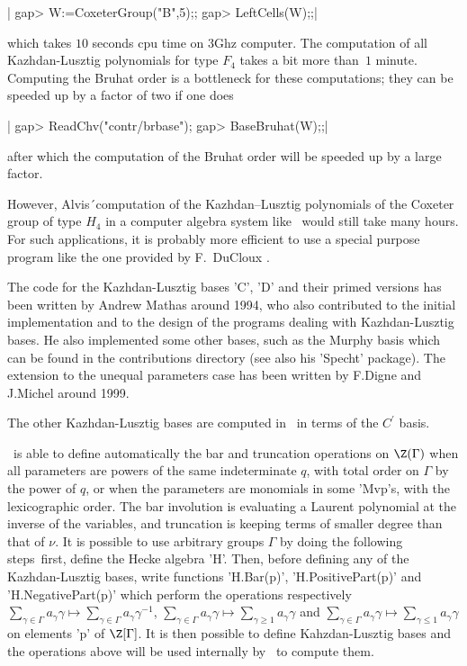|    gap> W:=CoxeterGroup("B",5);;
    gap> LeftCells(W);;|

which  takes $10$ seconds cpu time on 3Ghz computer. The computation of all
Kazhdan-Lusztig  polynomials  for  type  $F_4$  takes  a  bit more than~$1$
minute.  Computing the Bruhat order is a bottleneck for these computations;
they can be speeded up by a factor of two if one does\:

|    gap> ReadChv("contr/brbase");
    gap> BaseBruhat(W);;|

after  which the computation  of the Bruhat  order will be  speeded up by a
large factor.

However,  Alvis\'\ computation  of the  Kazhdan--Lusztig polynomials of the
Coxeter  group of type $H_4$ in a  computer algebra system like \GAP\ would
still take many hours. For such applications, it is probably more efficient
to  use a  special purpose  program like  the one  provided by  F.\ DuCloux
\cite{DuC91}.

The  code for the Kazhdan-Lusztig bases  'C', 'D' and their primed versions
has  been written by Andrew Mathas around 1994, who also contributed to the
initial  implementation  and  to  the  design  of the programs dealing with
Kazhdan-Lusztig  bases. He also  implemented some other  bases, such as the
Murphy  basis which can  be found in  the contributions directory (see also
his  'Specht' package).  The extension  to the  unequal parameters case has
been written by F.Digne and J.Michel around 1999.

The  other Kazhdan-Lusztig bases  are computed in  \CHEVIE\ in terms of the
$C^\prime$ basis.

\CHEVIE\  is able to define automatically the bar and truncation operations
on  $\Z(\Gamma)$ when all  parameters are powers  of the same indeterminate
$q$,  with  total  order  on  $\Gamma$  by  the  power  of $q$, or when the
parameters  are monomials in some 'Mvp's, with the lexicographic order. The
bar  involution is  evaluating a  Laurent polynomial  at the inverse of the
variables,  and truncation is keeping terms  of smaller degree than that of
$\nu$.  It  is  possible  to  use  arbitrary  groups  $\Gamma$ by doing the
following  steps\:\  first,  define  the  Hecke  algebra  'H'. Then, before
defining  any  of  the  Kazhdan-Lusztig  bases, write functions 'H.Bar(p)',
'H.PositivePart(p)'  and 'H.NegativePart(p)'  which perform  the operations
respectively $\sum_{\gamma\in\Gamma} a_\gamma\gamma\mapsto
\sum_{\gamma\in\Gamma}     a_\gamma\gamma^{-1}$,    $\sum_{\gamma\in\Gamma}
a_\gamma\gamma\mapsto     \sum_{\gamma\ge     1}     a_\gamma\gamma$    and
$\sum_{\gamma\in\Gamma}     a_\gamma\gamma\mapsto     \sum_{\gamma\le    1}
a_\gamma\gamma$  on elements  'p' of  $\Z[\Gamma]$. It  is then possible to
define  Kahzdan-Lusztig  bases  and  the  operations  above  will  be  used
internally by \CHEVIE\ to compute them.

